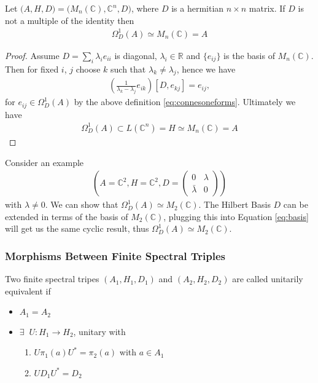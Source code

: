 \begin{lemma}
    Let $\big(A, H, D\big) = \big(M_n(\mathbb{C}), \mathbb{C}^n, D\big)$, where
    $D$ is a hermitian $n\times n$ matrix. If $D$ is not a multiple of the
    identity then
    \begin{align}
        \Omega _D ^1 (A)  \simeq  M_n(\mathbb{C}) = A
    \end{align}
\end{lemma}
\begin{proof}
    Assume $D = \sum _i \lambda _i e_{ii}$ is diagonal, $\lambda _i \in \mathbb{R}$ and
    $\{e_{ij}\}$ is the basis of $M_n(\mathbb{C})$. Then for fixed $i$, $j$ choose $k$
    such that $\lambda _k \neq \lambda _j$, hence we have
    \begin{align} \label{eq:basis}
        \left(\frac{1}{\lambda _k - \lambda _j} e_{ik}\right) [D, e_{kj}] =
        e_{ij},
    \end{align}
    for $e_{ij}\in \Omega _D ^1 (A)$ by the above definition
    \eqref{eq:connesoneforms}. Ultimately we have
    \begin{align}
        \Omega _D ^1
    (A) \subset L(\mathbb{C}^n) = H \simeq M_n(\mathbb{C}) = A
    \end{align}
\end{proof}

     Consider an example
     \begin{align}
             \left(A=\mathbb{C}^2, H=\mathbb{C}^2,
                 D = \begin{pmatrix} 0 & \lambda \\ \bar{\lambda} & 0
         \end{pmatrix}\right)
     \end{align}
     with $\lambda \neq 0$. We can show that $\Omega _D^1(A)
     \simeq M_2(\mathbb{C})$. The Hilbert Basis $D$ can be extended in terms of
    the basis of $M_2(\mathbb{C})$, plugging this into Equation
    \eqref{eq:basis} will get us the same cyclic result, thus
    $\Omega _D^1(A) \simeq M_2(\mathbb{C})$.
\

\subsubsection{Morphisms Between Finite Spectral Triples}
\begin{definition}
    Two finite spectral tripes $(A_1, H_1, D_1)$ and $(A_2, H_2, D_2)$ are
    called unitarily equivalent if
    \begin{itemize}
        \item $A_1 = A_2$
        \item $\exists \;\; U: H_1 \rightarrow H_2$, unitary with
            \begin{enumerate}
                \item  $U\pi_1(a)U^* = \pi_2(a)$ with $a \in A_1$
                \item  $UD_1 U^* = D_2$
            \end{enumerate}
    \end{itemize}
\end{definition}

